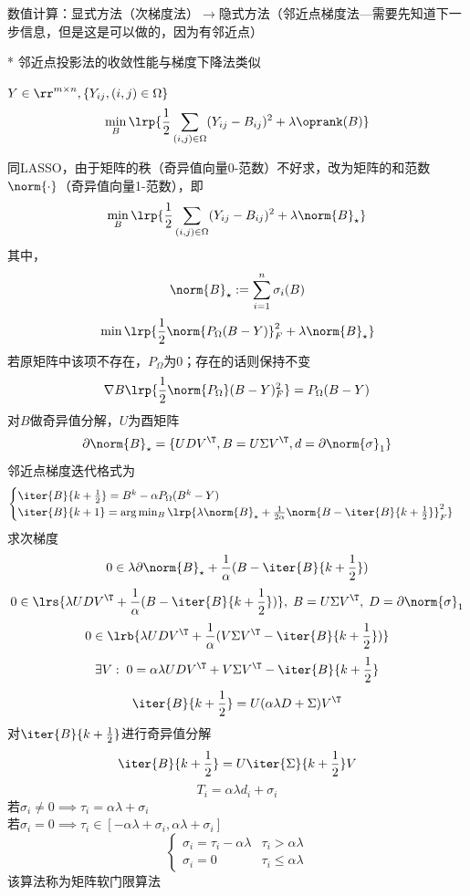 数值计算：显式方法（次梯度法）$\to$隐式方法（邻近点梯度法---需要先知道下一步信息，但是这是可以做的，因为有邻近点）

* 邻近点投影法的收敛性能与梯度下降法类似

\begin{example}[矩阵补全]
    $Y\in\rr^{m\times n},\{Y_{ij},(i,j)\in\Omega\}$
    \[\min_B\lrp{\frac{1}{2}\sum_{(i,j)\in\Omega}(Y_{ij}-B_{ij})^2+\lambda\oprank(B)}\]
\end{example}
\begin{analysis}
    同LASSO，由于矩阵的秩（奇异值向量0-范数）不好求，改为矩阵的和范数$\norm{\cdot}$（奇异值向量1-范数），即
    \[\min_B\lrp{\frac{1}{2}\sum_{(i,j)\in\Omega}(Y_{ij}-B_{ij})^2+\lambda\norm{B}_\star}\]
    其中，
    \[\norm{B}_\star:=\sum_{i=1}^n\sigma_i(B)\]
    \[\min\lrp{\frac{1}{2}\norm{P_\Omega(B-Y)}_F^2+\lambda\norm{B}_\star}\]
    若原矩阵中该项不存在，$P_\Omega$为$0$；存在的话则保持不变
    \[\nabla B\lrp{\frac{1}{2}\norm{P_\Omega}(B-Y)_F^2}=P_\Omega(B-Y)\]
    对$B$做奇异值分解，$U$为酉矩阵
    \[\partial\norm{B}_\star=\{UDV^\T, B=U\Sigma V^\T, d=\partial\norm{\sigma}_1\}\]
    邻近点梯度迭代格式为
    \[\begin{cases}
        \iter{B}{k+\frac{1}{2}}=B^k-\alpha P_\Omega(B^k-Y)\\
        \iter{B}{k+1}=\arg\min_B\lrp{\lambda\norm{B}_\star+\frac{1}{2\alpha}\norm{B-\iter{B}{k+\frac{1}{2}}}_F^2}
    \end{cases}\]
    求次梯度
    \[0\in\lambda\partial\norm{B}_\star+\frac{1}{\alpha}(B-\iter{B}{k+\frac{1}{2}})\]
    \[0\in\lrs{\lambda UDV^\T+\frac{1}{\alpha}(B-\iter{B}{k+\frac{1}{2}})},\;B=U\Sigma V^\T,\;D=\partial\norm{\sigma}_1\]
    \[0\in\lrb{\lambda UDV^\T +\frac{1}{\alpha}(V\Sigma V^\T-\iter{B}{k+\frac{1}{2}})}\]
    \[\exists V:\;0=\alpha\lambda UDV^\T+V\Sigma V^\T-\iter{B}{k+\frac{1}{2}}\]
    \[\iter{B}{k+\frac{1}{2}}=U(\alpha\lambda D+\Sigma)V^\T\]
    对$\iter{B}{k+\frac{1}{2}}$进行奇异值分解
    \[\iter{B}{k+\frac{1}{2}}=U\iter{\Sigma}{k+\frac{1}{2}}V\]
    \[T_i=\alpha\lambda d_i+\sigma_i\]
    若$\sigma_i\ne 0\implies \tau_i=\alpha\lambda+\sigma_i$\\
    若$\sigma_i=0\implies \tau_i\in[-\alpha\lambda+\sigma_i,\alpha\lambda+\sigma_i]$\\
    \[\begin{cases}
        \sigma_i=\tau_i-\alpha\lambda & \tau_i>\alpha\lambda\\
        \sigma_i=0 & \tau_i\leq\alpha\lambda
    \end{cases}\]
    该算法称为矩阵软门限算法
\end{analysis}

